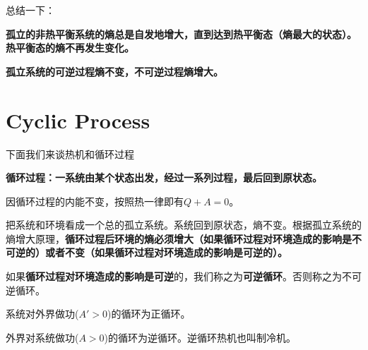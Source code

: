 \documentclass[CJK]{beamer}
\begin{document}
\begin{frame}
\bch
总结一下：

\bitem
\item{\bf 孤立的非热平衡系统的熵总是自发地增大，直到达到热平衡态（熵最大的状态）。热平衡态的熵不再发生变化。}
\item{\bf 孤立系统的可逆过程熵不变，不可逆过程熵增大。}
\eitem


\ech
\end{frame}


\section{Cyclic Process}

\begin{frame}
\bch
{\large 
下面我们来谈热机和循环过程}
\ech
\end{frame}


\begin{frame}
\bch
{}
\ech
\end{frame}

\begin{frame}
\bch
{\bf 循环过程：一系统由某个状态出发，经过一系列过程，最后回到原状态。}

\skiplines
\bitem
\item{因循环过程的内能不变，按照热一律即有$Q+A = 0$。}
\item{把系统和环境看成一个总的孤立系统。系统回到原状态，熵不变。根据孤立系统的熵增大原理，{\bf 循环过程后环境的熵必须增大（如果循环过程对环境造成的影响是不可逆的）或者不变（如果循环过程对环境造成的影响是可逆的）。}}
\eitem

如果{\bf 循环过程对环境造成的影响是可逆}的，我们称之为{\bf 可逆循环}。否则称之为不可逆循环。

\ech
\end{frame}

\begin{frame}
\bch

系统对外界做功($A'>0$)的循环为正循环。

\ech
\end{frame}

\begin{frame}
\bch

外界对系统做功($A>0$)的循环为逆循环。逆循环热机也叫制冷机。

\ech
\end{frame}
\end{document}
